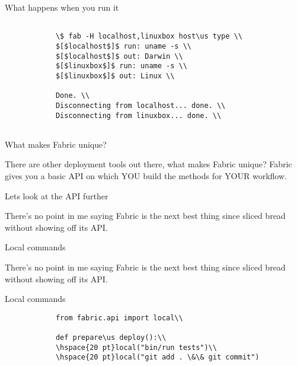 \documentclass[xcolor=dvipsnames]{beamer}
\def\us{\char`\_}
\begin{document}
    \begin{frame}{What happens when you run it}
        \begin{verbatim}

            \$ fab -H localhost,linuxbox host\us type \\
            $[$localhost$]$ run: uname -s \\
            $[$localhost$]$ out: Darwin \\
            $[$linuxbox$]$ run: uname -s \\
            $[$linuxbox$]$ out: Linux \\

            Done. \\
            Disconnecting from localhost... done. \\
            Disconnecting from linuxbox... done. \\
            
        \end{verbatim}

    \end{frame}

    \begin{frame}{What makes Fabric unique?}
        \begin{center}
        \pause There are other deployment tools out there, what makes Fabric unique?  Fabric gives you a basic API on which YOU build the methods for YOUR workflow.
        \end{center}
    \end{frame}

    \begin{frame}{Lets look at the API further}
        \begin{center}
        \pause There's no point in me saying Fabric is the next best thing since sliced bread without showing off its API.
        \end{center}
    \end{frame}

    \begin{frame}{Local commands}
        \begin{center}
        \pause There's no point in me saying Fabric is the next best thing since sliced bread without showing off its API.
        \end{center}
    \end{frame}
    
    \begin{frame}{Local commands}
        \begin{verbatim}
            from fabric.api import local\\

            def prepare\us deploy():\\
            \hspace{20 pt}local("bin/run tests")\\
            \hspace{20 pt}local("git add . \&\& git commit")
            
        \end{verbatim}

    \end{frame}  
\end{document}
